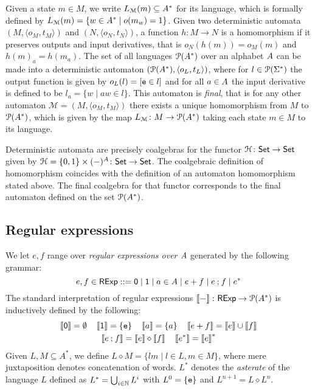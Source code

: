 Given a state $m \in M$, we write $L_{\mathcal{M}} (m) \subseteq {{A}^{\ast}}$ for its language, which is formally defined by $L_{\mathcal{M}}(m) = \{w \in {A}^\ast \mid o(m_w) = 1\}$. 
Given two deterministic automata $(M, \langle o_M, t_M \rangle)$ and $(N, \langle o_N, t_N \rangle)$, a function $h \colon M \to N$ is a homomorphism if it preserves outputs and input derivatives, that is $o_N(h(m))=o_M(m)$ and $h(m)_a = h(m_a)$. The set of all languages $\mathcal{P}({A}^{\ast})$ over an alphabet ${A}$ can be made into a deterministic automaton $(\mathcal{P}({A}^\ast), \langle o_L, t_L\rangle)$, where for $l \in \mathcal{P} (\Sigma^{\ast})$ the output function is given by $o_L(l)=[\mathtt{e} \in l]$ and for all $a \in {A}$ the input derivative is defined to be $l_a = \{w \mid aw \in l\}$. This automaton is \emph{final}, that is for any other automaton $\mathcal{M} = (M, \langle o_M, t_M \rangle)$ there exists a unique homomorphism from $M$ to $\mathcal{P}({A}^{\ast})$, which is given by the map $L_{\mathcal{M}} \colon M \to \mathcal{P}({A}^\ast)$ taking each state $m \in M$ to its language.
\begin{remark}
	Deterministic automata are precisely coalgebras for the functor $\mathcal{H} \colon {\mathsf{Set}} \to {\mathsf{Set}}$ given by $\mathcal{H} = \{0,1\} \times (-)^{A} \colon {\mathsf{Set}} \to {\mathsf{Set}}$. The coalgebraic definition of homomorphism coincides with the definition of an automaton homomorphism stated above. The final coalgebra for that functor corresponds to the final automaton defined on the set $\mathcal{P}({A}^\ast)$.
\end{remark}
\subsection{Regular expressions}\label{c2:subsec:regular_expressions}
We let $e, f$ range over \emph{regular expressions over ${A}$} generated by the following grammar:
$$e , f \in \mathsf{RExp} ::= \mathsf{0} \mid \mathsf{1} \mid a \in {A} \mid e + f \mid e \mathbin{;} f \mid e^{\ast}$$
The standard interpretation of regular expressions $\left\llbracket{-}\right\rrbracket \colon \mathsf{RExp} \to \mathcal{P}({A}^\ast)$ is inductively defined by the following:
\begin{gather*}
	\left\llbracket{\mathsf{0}}\right\rrbracket = \emptyset \quad \left\llbracket{\mathsf{1}}\right\rrbracket = \{\mathtt{e}\} \quad \left\llbracket{a}\right\rrbracket = \{ a \} \quad \left\llbracket{e + f}\right\rrbracket =  \left\llbracket{e}\right\rrbracket  \cup \left\llbracket{f}\right\rrbracket \\ \left\llbracket{e \mathbin{;}f}\right\rrbracket  = \left\llbracket{e}\right\rrbracket  \diamond \left\llbracket{f}\right\rrbracket \quad \left\llbracket{e^\ast}\right\rrbracket = \left\llbracket{e}\right\rrbracket^\ast
\end{gather*}
Given $L, M \subseteq A^\ast$, we define $L \diamond M = \{lm \mid l \in L, m \in M\}$, where mere juxtaposition denotes concatenation of words. $L^\ast$ denotes the \emph{asterate} of the language $L$ defined as $L^\ast = \bigcup_{i \in \mathbb{N}} L^i$ with $L^0 = \{\mathtt{e}\}$ and $L^{n + 1} = L \diamond L^{n}$.

